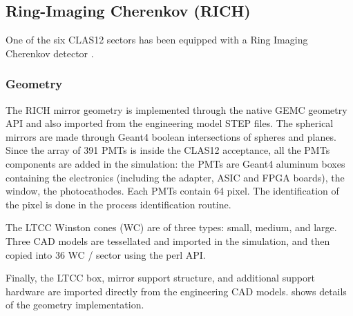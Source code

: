 \subsection{Ring-Imaging Cherenkov (RICH)}

One of the six CLAS12 sectors has been equipped with a Ring Imaging Cherenkov detector \cite{rich-nim}.

\subsubsection{Geometry}
The RICH mirror geometry is implemented through the native GEMC geometry API and also imported from the engineering model STEP files.
The spherical mirrors are made through Geant4 boolean intersections of spheres and planes.
Since the array of 391 PMTs is inside the CLAS12 acceptance, all the PMTs components are added in the simulation:
the PMTs are Geant4 aluminum boxes containing the electronics (including the adapter, ASIC and FPGA boards), the window, the photocathodes.
Each PMTs contain 64 pixel. The identification of the pixel is done in the process identification routine.

The LTCC Winston cones (WC) are of three types: small, medium, and large. Three CAD models are tessellated and imported in the simulation, and
then copied into 36 WC / sector using the perl API.

Finally, the LTCC box, mirror support structure, and additional support hardware are imported directly from the engineering CAD models.
 shows details of the geometry implementation.


